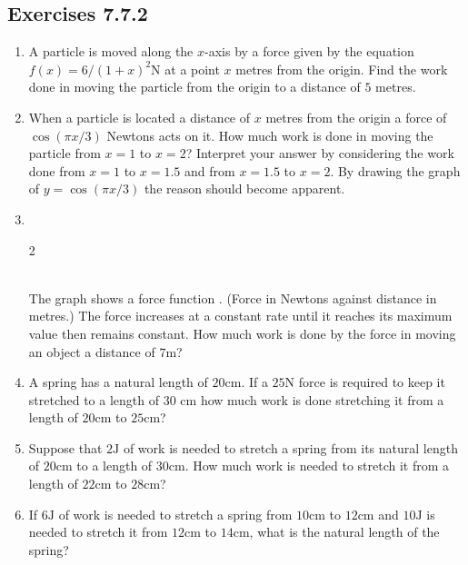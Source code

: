 \subsection{Exercises 7.7.2}
\begin{enumerate}
\item A particle is moved along the $x$-axis by a force given by the equation $f (x) =6/\left (1 +x\right )^{2} \mbox{N}$ at a point $x$ metres from the origin. Find the work done in moving the particle from the origin
to a distance of $5$ metres. 

\item When a particle is located a distance of $x$ metres from the origin a force of $\cos  \left (\pi  x/3\right )$ Newtons acts on it. How much work is done in moving the particle from $x =1$ to $x =2$? Interpret your answer by considering the work done from $x =1$ to $x =1.5$ and from $x =1.5$ to $x =2$. By drawing the graph of $y =\cos  \left (\pi  x/3\right )$ the reason should become apparent. 

\item \  \\\relax
\columnsep =30pt
\begin {multicols}{2}
    
\setlength\fboxrule{0in}\setlength\fboxsep{0.2in}
\\\relax The graph shows a force function . (Force in Newtons
against distance in metres.) The force increases at a constant rate until it reaches its maximum value then
remains constant. How much work is done by the force in moving an object a distance of $7 \mbox{m}$? 
\end {multicols}


\item A spring has a natural length of $20 \mbox{cm}$. If a $25 \mbox{N}$ force is required to keep it stretched to a length of $30$ $\mbox{cm}$ how much work is done stretching it from a length of $20 \mbox{cm}$ to $25 \mbox{cm}$? 

\item Suppose that $2 \mbox{J}$ of work is needed to stretch a spring from its natural length of $20 \mbox{cm}$ to a length of $30 \mbox{cm}$. How much work is needed to stretch it from a length
of $22 \mbox{cm}$ to $28 \mbox{cm}$? 

\item If $6 \mbox{J}$ of work is needed to stretch a spring from $10 \mbox{cm}$ to $12 \mbox{cm}$ and $10 \mbox{J}$ is needed to stretch it from $12 \mbox{cm}$ to $14 \mbox{cm}$, what is the natural length of the spring? \end{enumerate}


